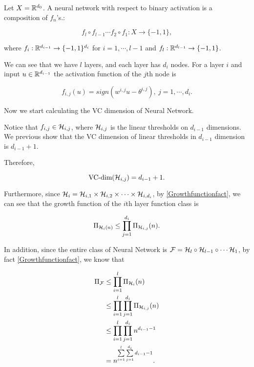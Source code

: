 \documentclass[../main.tex]{subfiles}
\begin{document}
	 \begin{definition}
	 	Let $X = \mathbb{R}^{d_0}$. A neural network with respect to binary activation is a composition of $f_n $'s.: 
	 	
	 	\begin{equation}
	 	f_l \circ f_{l-1} \cdots f_2 \circ f_1: X \to \{-1,1\},
	 	\end{equation}
	 	
	 	where $f_i:\mathbb{R}^{d_{i-1}} \to \{-1, 1\}^{d_i}$ for $i = 1,\cdots, l-1$ and $f_l: \mathbb{R}^{d_{l-1}} \to \{-1,1\}$.
	
	
	We can see that we have $l$ layers, and each layer has $d_i$ nodes. For a layer $i$ and input $u \in \mathbb{R}^{d_{i-1}}$ the activation function of the $j$th node is
	
		\begin{equation}
			f_{i,j}(u) = sign(w^{i,j}u-\theta^{i,j}), \ j = 1,\cdots, d_i.
		\end{equation}
	 \end{definition}
 
 	Now we start calculating the VC dimension of Neural Network.
 	
 	Notice that $f_{i,j} \in \mathcal{H}_{i,j}$, where $\mathcal{H}_{i,j}$ is the linear thresholds on $d_{i-1}$ dimensions. We previous show that the VC dimension of linear thresholds in $d_{i-1}$ dimension is $d_{i-1} + 1$.
 	
 	Therefore, 
 	
 	\begin{equation*}
 		\textmd{VC-dim}(\mathcal{H}_{i,j}) = d_{i-1} + 1.
 	\end{equation*}
 
 	Furthermore, since $\mathcal{H}_i = \mathcal{H}_{i,1} \times \mathcal{H}_{i,2} \times \cdots \times \mathcal{H}_{i,d_i}$, by \ref{Growthfunctionfact}, we can see that the growth function of the $i$th layer function class is 
 	
 	\begin{equation*}
 		\Pi_{\mathcal{H}_i(n)} \leq \prod\limits_{j=1}^{d_i} \Pi_{\mathcal{H}_{i,j}}(n).
 	\end{equation*}
 	
 	In addition, since the entire class of Neural Network is $\mathcal{F} = \mathcal{H}_l \circ \mathcal{H}_{l-1} \circ \cdots \mathcal{H}_1$, by fact \ref{Growthfunctionfact}, we know that
 	
 	\begin{equation*}
 		\begin{aligned}
 		 	\Pi_{\mathcal{F}} & \leq \prod\limits_{i=1}^l \Pi_{\mathcal{H}_i}(n) \\
 		 			 & \leq \prod\limits_{i=1}^l \prod\limits_{j=1}^{d_i} \Pi_{\mathcal{H}_{i,j}}(n) \\
 		 			 & \leq \prod\limits_{i=1}^l \prod\limits_{j=1}^{d_i} n^{d_{i-1} - 1} \\
 		 			 & =  n^{\sum\limits_{i=1}^l \sum\limits_{j=1}^{d_i}d_{i-1} - 1}.
 		\end{aligned}
 	\end{equation*}
\end{document}
